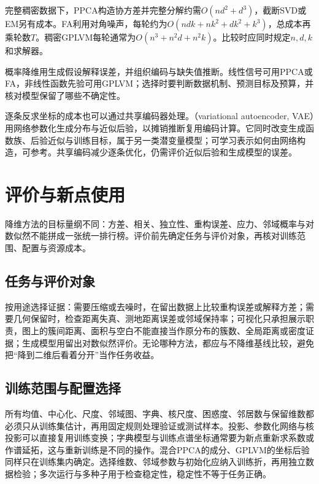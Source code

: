完整稠密数据下，PPCA构造协方差并完整分解约需$O(nd^2+d^3)$，截断SVD或EM另有成本。FA利用对角噪声，每轮约为$O(ndk+nk^2+dk^2+k^3)$，总成本再乘轮数$T$。稠密GPLVM每轮通常为$O(n^3+n^2d+n^2k)$。比较时应同时规定$n,d,k$和求解器。

概率降维用生成假设解释误差，并组织编码与缺失值推断。线性信号可用PPCA或FA，非线性函数先验可用GPLVM；选择时要判断数据机制、预测目标及预算，并核对模型保留了哪些不确定性。

逐条反求坐标的成本也可以通过共享编码器处理。（variational autoencoder, VAE）用网络参数化生成分布与近似后验，以摊销推断复用编码计算。它同时改变生成函数族、后验近似与训练目标，属于另一类潜变量模型；可学习表示如何由网络构造，可参考。共享编码减少逐条优化，仍需评价近似后验和生成模型的误差。

\section{评价与新点使用}
\label{sec:dim-evaluation}

降维方法的目标量纲不同：方差、相关、独立性、重构误差、应力、邻域概率与对数似然不能拼成一张统一排行榜。评价前先确定任务与评价对象，再核对训练范围、配置与资源成本。

\subsection{任务与评价对象}

按用途选择证据：需要压缩或去噪时，在留出数据上比较重构误差或解释方差；需要几何保留时，检查距离失真、测地距离误差或邻域保持率；可视化只承担展示职责，图上的簇间距离、面积与空白不能直接当作原分布的簇数、全局距离或密度证据；生成模型用留出对数似然评价。无论哪种方法，都应与不降维基线比较，避免把“降到二维后看着分开”当作任务收益。

\subsection{训练范围与配置选择}

所有均值、中心化、尺度、邻域图、字典、核尺度、困惑度、邻居数与保留维数都必须只从训练集估计，再用固定规则处理验证或测试样本。投影、参数化网络与核投影可以直接复用训练变换；字典模型与训练点谱坐标通常要为新点重新求系数或作谱延拓，这与重新训练是不同的操作。混合PPCA的成分、GPLVM的坐标后验同样只在训练集内确定。选择维数、邻域参数与初始化应纳入训练折，再用独立数据检验；多次运行与多种子用于检查稳定性，稳定性不等于任务正确。

